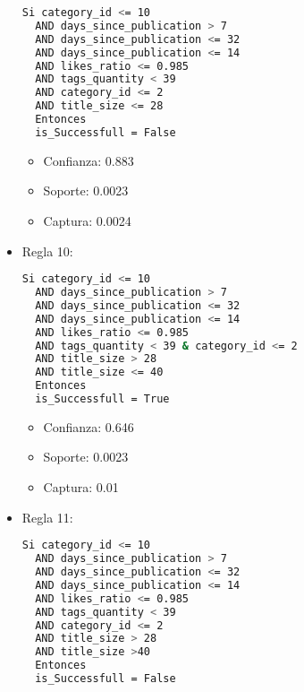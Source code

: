 \begin{itemize}
\begin{lstlisting}[language=bash, numbers=none]
  Si category_id <= 10
  AND days_since_publication > 7
  AND days_since_publication <= 32
  AND days_since_publication <= 14
  AND likes_ratio <= 0.985
  AND tags_quantity < 39
  AND category_id <= 2
  AND title_size <= 28
  Entonces
  is_Successfull = False
\end{lstlisting}

    \begin{itemize}
      \item Confianza: 0.883
      \item Soporte: 0.0023
      \item Captura: 0.0024
    \end{itemize}

  \item Regla 10:

\begin{lstlisting}[language=bash, numbers=none]
  Si category_id <= 10
  AND days_since_publication > 7
  AND days_since_publication <= 32
  AND days_since_publication <= 14
  AND likes_ratio <= 0.985
  AND tags_quantity < 39 & category_id <= 2
  AND title_size > 28
  AND title_size <= 40
  Entonces
  is_Successfull = True

\end{lstlisting}

    \begin{itemize}
      \item Confianza: 0.646
      \item Soporte: 0.0023
      \item Captura: 0.01
    \end{itemize}

  \item Regla 11:

\begin{lstlisting}[language=bash, numbers=none]
  Si category_id <= 10
  AND days_since_publication > 7
  AND days_since_publication <= 32
  AND days_since_publication <= 14
  AND likes_ratio <= 0.985
  AND tags_quantity < 39
  AND category_id <= 2
  AND title_size > 28
  AND title_size >40
  Entonces
  is_Successfull = False
\end{lstlisting}


\end{itemize}
